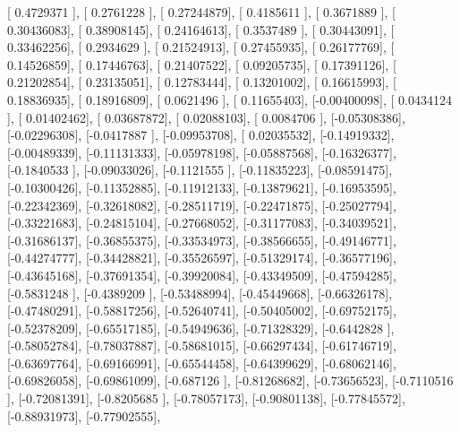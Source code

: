 \documentclass{article}
\begin{document}
       [ 0.4729371 ],
       [ 0.2761228 ],
       [ 0.27244879],
       [ 0.4185611 ],
       [ 0.3671889 ],
       [ 0.30436083],
       [ 0.38908145],
       [ 0.24164613],
       [ 0.3537489 ],
       [ 0.30443091],
       [ 0.33462256],
       [ 0.2934629 ],
       [ 0.21524913],
       [ 0.27455935],
       [ 0.26177769],
       [ 0.14526859],
       [ 0.17446763],
       [ 0.21407522],
       [ 0.09205735],
       [ 0.17391126],
       [ 0.21202854],
       [ 0.23135051],
       [ 0.12783444],
       [ 0.13201002],
       [ 0.16615993],
       [ 0.18836935],
       [ 0.18916809],
       [ 0.0621496 ],
       [ 0.11655403],
       [-0.00400098],
       [ 0.0434124 ],
       [ 0.01402462],
       [ 0.03687872],
       [ 0.02088103],
       [ 0.0084706 ],
       [-0.05308386],
       [-0.02296308],
       [-0.0417887 ],
       [-0.09953708],
       [ 0.02035532],
       [-0.14919332],
       [-0.00489339],
       [-0.11131333],
       [-0.05978198],
       [-0.05887568],
       [-0.16326377],
       [-0.1840533 ],
       [-0.09033026],
       [-0.1121555 ],
       [-0.11835223],
       [-0.08591475],
       [-0.10300426],
       [-0.11352885],
       [-0.11912133],
       [-0.13879621],
       [-0.16953595],
       [-0.22342369],
       [-0.32618082],
       [-0.28511719],
       [-0.22471875],
       [-0.25027794],
       [-0.33221683],
       [-0.24815104],
       [-0.27668052],
       [-0.31177083],
       [-0.34039521],
       [-0.31686137],
       [-0.36855375],
       [-0.33534973],
       [-0.38566655],
       [-0.49146771],
       [-0.44274777],
       [-0.34428821],
       [-0.35526597],
       [-0.51329174],
       [-0.36577196],
       [-0.43645168],
       [-0.37691354],
       [-0.39920084],
       [-0.43349509],
       [-0.47594285],
       [-0.5831248 ],
       [-0.4389209 ],
       [-0.53488994],
       [-0.45449668],
       [-0.66326178],
       [-0.47480291],
       [-0.58817256],
       [-0.52640741],
       [-0.50405002],
       [-0.69752175],
       [-0.52378209],
       [-0.65517185],
       [-0.54949636],
       [-0.71328329],
       [-0.6442828 ],
       [-0.58052784],
       [-0.78037887],
       [-0.58681015],
       [-0.66297434],
       [-0.61746719],
       [-0.63697764],
       [-0.69166991],
       [-0.65544458],
       [-0.64399629],
       [-0.68062146],
       [-0.69826058],
       [-0.69861099],
       [-0.687126  ],
       [-0.81268682],
       [-0.73656523],
       [-0.7110516 ],
       [-0.72081391],
       [-0.8205685 ],
       [-0.78057173],
       [-0.90801138],
       [-0.77845572],
       [-0.88931973],
       [-0.77902555],
\end{document}
